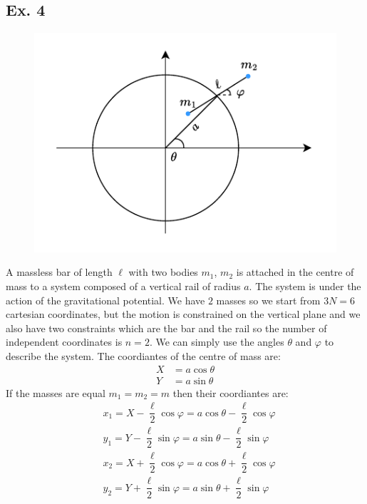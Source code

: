 \subsection{Ex. 4}
\begin{figure}[H]
  \centering
  \includegraphics[width=0.7\linewidth]{res/svg/rail_and_bar.drawio}
\end{figure}
A massless bar of length $\ell$ with two bodies $m_1$, $m_2$ is attached in the centre of mass to a system composed of a vertical rail of radius $a$. The system is under the action of the gravitational potential. We have $2$ masses so we start from $3N = 6$ cartesian coordinates, but the motion is constrained on the vertical plane and we also have two constraints which are the bar and the rail so the number of independent coordinates is $n=2$. We can simply use the angles $\theta$ and $\varphi$ to describe the system. The coordiantes of the centre of mass are:
\begin{equation}
  \begin{split}
    X &= a\cos\theta \\[8pt]
    Y &= a\sin\theta
  \end{split}
\end{equation}
If the masses are equal $m_1 = m_2 = m$ then their coordiantes are:
\begin{equation}
  \begin{split}
    &x_1 = X - \dfrac{\ell}{2}\cos\varphi = a\cos\theta - \dfrac{\ell}{2}\cos\varphi \\[8pt]
    &y_1 = Y - \dfrac{\ell}{2}\sin\varphi = a\sin\theta - \dfrac{\ell}{2}\sin\varphi \\[8pt]
    &x_2 = X + \dfrac{\ell}{2}\cos\varphi = a\cos\theta + \dfrac{\ell}{2}\cos\varphi \\[8pt]
    &y_2 = Y + \dfrac{\ell}{2}\sin\varphi = a\sin\theta + \dfrac{\ell}{2}\sin\varphi \\[8pt]
  \end{split}
\end{equation}
